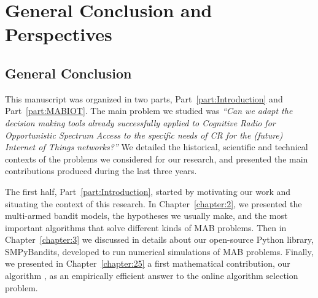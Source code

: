 
\chapter{General Conclusion and Perspectives}
\label{chapter:conclusion}

\graphicspath{{2-Chapters/6-Chapter/Images/}}



\section{General Conclusion}


This manuscript was organized in two parts, Part~\ref{part:Introduction} and Part~\ref{part:MABIOT}.
%
The main problem we studied was \emph{``Can we adapt the decision making tools already successfully applied to Cognitive Radio for Opportunistic Spectrum Access to the specific needs of CR for the (future) Internet of Things networks?''}
%
We detailed the historical, scientific and technical contexts of the problems we considered for our research, and presented the main contributions produced during the last three years.

The first half, Part~\ref{part:Introduction}, started by motivating our work and situating the context of this research.
In Chapter~\ref{chapter:2}, we presented the multi-armed bandit models, the hypotheses we usually make, and the most important algorithms that solve different kinds of MAB problems.
Then in Chapter~\ref{chapter:3} we discussed in details about our open-source Python library, SMPyBandits, developed to run numerical simulations of MAB problems.
%
Finally, we presented in Chapter~\ref{chapter:25} a first mathematical contribution, our algorithm \Aggr, as an empirically efficient answer to the online algorithm selection problem.

